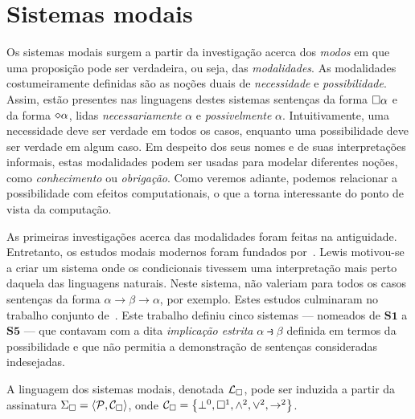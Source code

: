 \section{Sistemas modais}

Os sistemas modais surgem a partir da investigação acerca dos \emph{modos} em que uma proposição pode ser verdadeira, ou seja, das \emph{modalidades}.
As modalidades costumeiramente definidas são as noções duais de \emph{necessidade} e \emph{possibilidade}.
Assim, estão presentes nas linguagens destes sistemas sentenças da forma $\Box\alpha$ e da forma $\pos\alpha$, lidas \emph{necessariamente} $\alpha$ e \emph{possivelmente} $\alpha$.
Intuitivamente, uma necessidade deve ser verdade em todos os casos, enquanto uma possibilidade deve ser verdade em algum caso.
Em despeito dos seus nomes e de suas interpretações informais, estas modalidades podem ser usadas para modelar diferentes noções, como \emph{conhecimento} ou \emph{obrigação}.
Como veremos adiante, podemos relacionar a possibilidade com efeitos computationais, o que a torna interessante do ponto de vista da computação.

\vspace{0.5\baselineskip}
As primeiras investigações acerca das modalidades foram feitas na antiguidade.
Entretanto, os estudos modais modernos foram fundados por~\cite{Lewis.1912}.
Lewis motivou-se a criar um sistema onde os condicionais tivessem uma interpretação mais perto daquela das linguagens naturais.
Neste sistema, não valeriam para todos os casos sentenças da forma $\alpha\to\beta\to\alpha$, por exemplo.
Estes estudos culminaram no trabalho conjunto de~\cite{Lewis+Langford.1932}.
Este trabalho definiu cinco sistemas --- nomeados de $\mathbf{S1}$ a $\mathbf{S5}$ --- que contavam com a dita \emph{implicação estrita} $\alpha\strictif\beta$ definida em termos da possibilidade e que não permitia a demonstração de sentenças consideradas indesejadas.

\vspace{0.5\baselineskip}
\begin{tcolorbox}[enhanced jigsaw, breakable, sharp corners, colframe=black, colback=white, boxrule=0.5pt, left=1.5mm, right=1.5mm, top=1.5mm, bottom=1.5mm]
\begin{definition}\label{modal.language}
    A linguagem dos sistemas modais, denotada $\mathcal{L}_{\Box}$, pode ser induzida a partir da assinatura $\Sigma_{\Box}=\langle\mathcal{P},\mathcal{C}_{\Box}\rangle$, onde $\mathcal{C}_{\Box}=\left\{\bot^0,\Box^1,\wedge^2,\vee^2,\to^2\right\}$.
\end{definition}
\end{tcolorbox}

